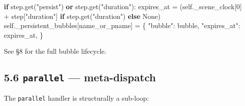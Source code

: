 \documentclass[
  12pt,
  letterpaper,
]{book}
\newenvironment{Shaded}{}{}
\newcommand{\ControlFlowTok}[1]{\textcolor[rgb]{0.00,0.44,0.13}{\textbf{#1}}}
\newcommand{\DecValTok}[1]{\textcolor[rgb]{0.25,0.63,0.44}{#1}}
\newcommand{\KeywordTok}[1]{\textcolor[rgb]{0.00,0.44,0.13}{\textbf{#1}}}
\newcommand{\NormalTok}[1]{#1}
\newcommand{\OperatorTok}[1]{\textcolor[rgb]{0.40,0.40,0.40}{#1}}
\newcommand{\StringTok}[1]{\textcolor[rgb]{0.25,0.44,0.63}{#1}}
\newcommand{\VariableTok}[1]{\textcolor[rgb]{0.10,0.09,0.49}{#1}}
\begin{document}
\begin{Shaded}
\begin{Highlighting}[]
\ControlFlowTok{if}\NormalTok{ step.get(}\StringTok{"persist"}\NormalTok{) }\KeywordTok{or}\NormalTok{ step.get(}\StringTok{"duration"}\NormalTok{):}
\NormalTok{    expires\_at }\OperatorTok{=}\NormalTok{ (}\VariableTok{self}\NormalTok{.\_scene\_clock[}\DecValTok{0}\NormalTok{] }\OperatorTok{+}\NormalTok{ step[}\StringTok{"duration"}\NormalTok{]}
                  \ControlFlowTok{if}\NormalTok{ step.get(}\StringTok{"duration"}\NormalTok{) }\ControlFlowTok{else} \VariableTok{None}\NormalTok{)}
    \VariableTok{self}\NormalTok{.\_persistent\_bubbles[name\_or\_pname] }\OperatorTok{=}\NormalTok{ \{}
        \StringTok{"bubble"}\NormalTok{: bubble,}
        \StringTok{"expires\_at"}\NormalTok{: expires\_at,}
\NormalTok{    \}}
\end{Highlighting}
\end{Shaded}

See §8 for the full bubble lifecycle.

\subsection{\texorpdfstring{5.6 \texttt{parallel} ---
meta-dispatch}{5.6 parallel --- meta-dispatch}}\label{parallel-meta-dispatch}

The \texttt{parallel} handler is structurally a sub-loop:
\end{document}
